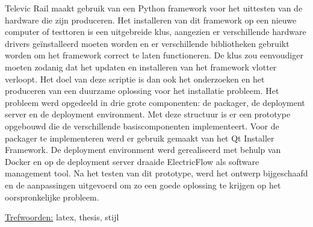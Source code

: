 Televic Rail maakt gebruik van een Python framework voor het uittesten van de hardware die zijn produceren.
Het installeren van dit framework op een nieuwe computer of testtoren is een uitgebreide klus, aangezien er verschillende hardware drivers ge\"installeerd moeten worden en er verschillende bibliotheken gebruikt worden om het framework correct te laten functioneren.
De klus zou eenvoudiger moeten zodanig dat het updaten en installeren van het framework vlotter verloopt.
%
Het doel van deze scriptie is dan ook het onderzoeken en het produceren van een duurzame oplossing voor het installatie probleem.
Het probleem werd opgedeeld in drie grote componenten: de packager, de deployment server en de deployment environment.
Met deze structuur is er een prototype opgebouwd die de verschillende basiscomponenten implementeert.
Voor de packager te implementeren werd er gebruik gemaakt van het Qt Installer Framework.
De deployment environment werd gerealiseerd met behulp van Docker en op de deployment server draaide ElectricFlow als software management tool.
Na het testen van dit prototype, werd het ontwerp bijgeschaafd en de aanpassingen uitgevoerd om zo een goede oplossing te krijgen op het oorspronkelijke probleem.

\underline{Trefwoorden:} latex, thesis, stijl
